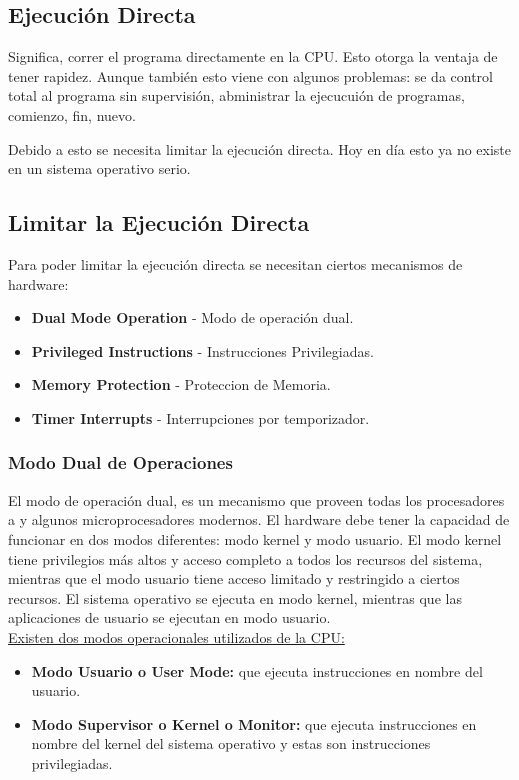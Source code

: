 \documentclass[../main.tex]{subfiles}
\begin{document}
    \subsection{Ejecución Directa}
        Significa, correr el programa directamente en la CPU. Esto otorga la ventaja de tener rapidez. Aunque también esto viene con algunos problemas: se da control total al programa sin supervisión, abministrar la ejecucuión de programas, comienzo, fin, nuevo.

        Debido a esto se necesita limitar la ejecución directa. Hoy en día esto ya no existe en un sistema operativo serio.
	
    \subsection{Limitar la Ejecución Directa}
        Para poder limitar la ejecución directa se necesitan ciertos mecanismos de hardware:
        \begin{itemize}
            \item \textbf{Dual Mode Operation} - Modo de operación dual.
            \item \textbf{Privileged Instructions} - Instrucciones Privilegiadas.
            \item \textbf{Memory Protection} - Proteccion de Memoria.
            \item \textbf{Timer Interrupts} - Interrupciones por temporizador.
        \end{itemize}
        
        \subsubsection*{Modo Dual de Operaciones}
            El modo de operación dual, es un mecanismo que proveen todas los procesadores a y algunos microprocesadores modernos. El hardware debe tener la capacidad de funcionar en dos modos diferentes: modo kernel y modo usuario. El modo kernel tiene privilegios más altos y acceso completo a todos los recursos del sistema, mientras que el modo usuario tiene acceso limitado y restringido a ciertos recursos. El sistema operativo se ejecuta en modo kernel, mientras que las aplicaciones de usuario se ejecutan en modo usuario.\\

            \underline{Existen dos modos operacionales utilizados de la CPU:}
            \begin{itemize}
                \item \textbf{Modo Usuario o User Mode:} que ejecuta instrucciones en nombre del usuario.
                \item \textbf{Modo Supervisor o Kernel o Monitor:} que ejecuta instrucciones en nombre del kernel del sistema operativo y estas son instrucciones privilegiadas.
            \end{itemize}
    
\end{document}
